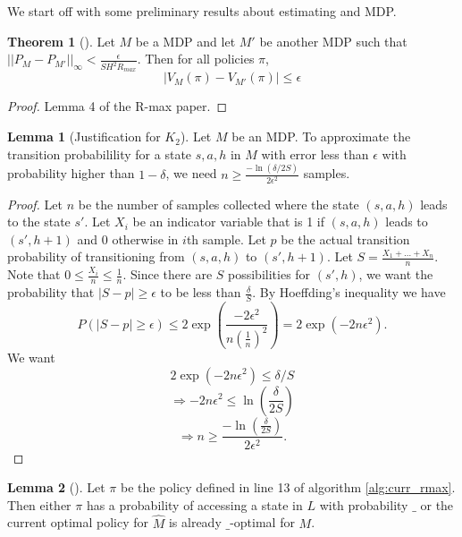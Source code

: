 \documentclass[12pt, letterpaper]{article}
\theoremstyle{definition}
\newtheorem*{thm}{Theorem}
\newtheorem*{lemma}{Lemma}
\theoremstyle{remark}
\begin{document}
We start off with some preliminary results about estimating and MDP.

\begin{thm}[]
    Let \(M\) be a MDP and let \(M'\) be another MDP such that \(||P_{M} - P_{M'}||_{\infty} < \frac{\epsilon}{SH^2R_{max}}\). Then for all policies \(\pi\),
    \[|V_{M}(\pi) - V_{M'}(\pi)| \leq \epsilon\]
\end{thm}

\begin{proof}[Proof]
    Lemma 4 of the R-max paper.
\end{proof}

\begin{lemma}[Justification for \(K_2\)]
    Let \(M\) be an MDP. To approximate the transition probabilility for a state \(s, a, h\) in \(M\) with error less than \(\epsilon\) with probability higher than \(1 - \delta\), we need \(n \geq \frac{-\ln(\delta/2S)}{2\epsilon^2}\) samples.
\end{lemma}

\begin{proof}[Proof]
    Let \(n\) be the number of samples collected where the state \((s, a, h)\) leads to the state \(s'\). Let \(X_i\) be an indicator variable that is 1 if \((s, a, h)\) leads to \((s', h+1)\) and 0 otherwise in \(i\)th sample. Let \(p\) be the actual transition probability of transitioning from \((s, a, h)\) to \((s', h+1)\). Let \(S = \frac{X_1 + \ldots + X_{n}}{n}\). Note that \(0 \leq \frac{X_i}{n} \leq \frac{1}{n}\). Since there are \(S\) possibilities for \((s', h)\), we want the probability that \(|S - p| \geq \epsilon\) to be less than \(\frac{\delta}{S}\). By Hoeffding's inequality we have
    \[P(|S - p| \geq \epsilon) \leq 2 \exp (\frac{-2\epsilon^{2}}{n(\frac{1}{n})^2}) = 2 \exp(-2n\epsilon^2).\]
    We want
    \[2 \exp(-2n\epsilon^2) \leq \delta/S\]
    \[\Rightarrow -2n\epsilon^2 \leq \ln(\frac{\delta}{2S})\]
    \[\Rightarrow n \geq \frac{-\ln(\frac{\delta}{2S})}{2\epsilon^2}.\]
\end{proof}

\begin{lemma}[]
    Let \(\pi\) be the policy defined in line 13 of algorithm \ref{alg:curr_rmax}. Then either \(\pi\) has a probability of accessing a state in \(L\) with probability \(\_\) or the current optimal policy for \(\hat{M}\) is already \(\_\)-optimal for \(M\).
\end{lemma}
\end{document}
